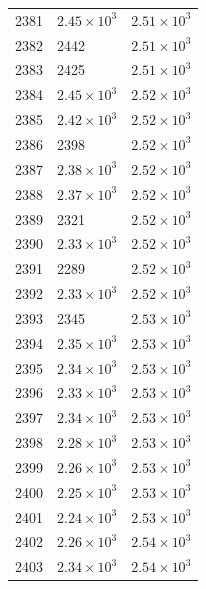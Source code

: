 \begin{table}[H]
\begin{tabular}{lll}
2381 & $\displaystyle 2.45 \times 10^{3}$ & $\displaystyle 2.51 \times 10^{3}$ \\
2382 & 2442 & $\displaystyle 2.51 \times 10^{3}$ \\
2383 & 2425 & $\displaystyle 2.51 \times 10^{3}$ \\
2384 & $\displaystyle 2.45 \times 10^{3}$ & $\displaystyle 2.52 \times 10^{3}$ \\
2385 & $\displaystyle 2.42 \times 10^{3}$ & $\displaystyle 2.52 \times 10^{3}$ \\
2386 & 2398 & $\displaystyle 2.52 \times 10^{3}$ \\
2387 & $\displaystyle 2.38 \times 10^{3}$ & $\displaystyle 2.52 \times 10^{3}$ \\
2388 & $\displaystyle 2.37 \times 10^{3}$ & $\displaystyle 2.52 \times 10^{3}$ \\
2389 & 2321 & $\displaystyle 2.52 \times 10^{3}$ \\
2390 & $\displaystyle 2.33 \times 10^{3}$ & $\displaystyle 2.52 \times 10^{3}$ \\
2391 & 2289 & $\displaystyle 2.52 \times 10^{3}$ \\
2392 & $\displaystyle 2.33 \times 10^{3}$ & $\displaystyle 2.52 \times 10^{3}$ \\
2393 & 2345 & $\displaystyle 2.53 \times 10^{3}$ \\
2394 & $\displaystyle 2.35 \times 10^{3}$ & $\displaystyle 2.53 \times 10^{3}$ \\
2395 & $\displaystyle 2.34 \times 10^{3}$ & $\displaystyle 2.53 \times 10^{3}$ \\
2396 & $\displaystyle 2.33 \times 10^{3}$ & $\displaystyle 2.53 \times 10^{3}$ \\
2397 & $\displaystyle 2.34 \times 10^{3}$ & $\displaystyle 2.53 \times 10^{3}$ \\
2398 & $\displaystyle 2.28 \times 10^{3}$ & $\displaystyle 2.53 \times 10^{3}$ \\
2399 & $\displaystyle 2.26 \times 10^{3}$ & $\displaystyle 2.53 \times 10^{3}$ \\
2400 & $\displaystyle 2.25 \times 10^{3}$ & $\displaystyle 2.53 \times 10^{3}$ \\
2401 & $\displaystyle 2.24 \times 10^{3}$ & $\displaystyle 2.53 \times 10^{3}$ \\
2402 & $\displaystyle 2.26 \times 10^{3}$ & $\displaystyle 2.54 \times 10^{3}$ \\
2403 & $\displaystyle 2.34 \times 10^{3}$ & $\displaystyle 2.54 \times 10^{3}$ \\

\end{tabular}
\end{table}
